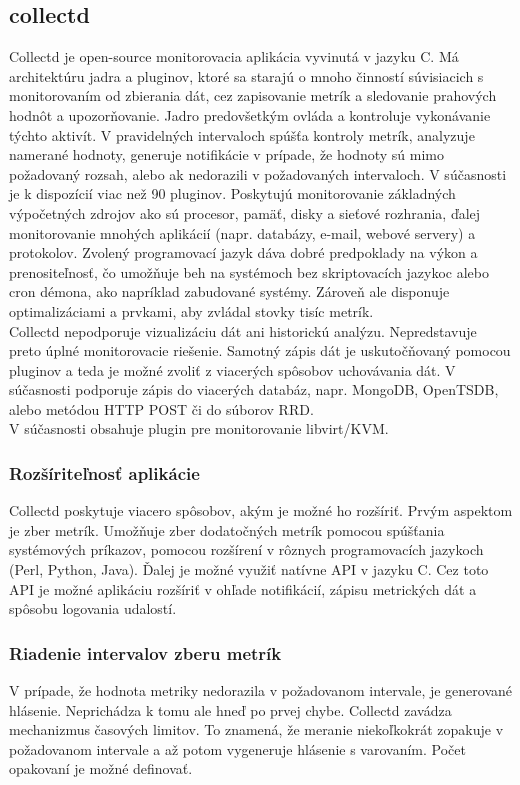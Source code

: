 \documentclass[11pt,final,oneside]{fithesis}
\begin{document}
\subsection{collectd}
Collectd je open-source monitorovacia aplikácia vyvinutá v jazyku C. Má architektúru jadra a pluginov, ktoré sa starajú o mnoho činností súvisiacich s monitorovaním od zbierania dát, cez
zapisovanie metrík a sledovanie prahových hodnôt a upozorňovanie. Jadro predovšetkým ovláda a kontroluje vykonávanie týchto aktivít. V pravidelných intervaloch spúšťa kontroly metrík, 
analyzuje namerané hodnoty, generuje notifikácie v prípade, že hodnoty sú mimo požadovaný rozsah, alebo ak nedorazili 
v požadovaných intervaloch. V súčasnosti je k dispozícií viac než 90 pluginov. Poskytujú monitorovanie základných výpočetných zdrojov ako sú procesor, pamäť, disky a sieťové rozhrania, ďalej monitorovanie
mnohých aplikácií (napr. databázy, e-mail, webové servery) a protokolov. Zvolený programovací jazyk dáva dobré predpoklady na výkon a prenositeľnosť, čo umožňuje beh na systémoch bez 
skriptovacích jazykoc alebo cron démona, ako napríklad zabudované systémy. Zároveň ale disponuje optimalizáciami a prvkami, aby zvládal stovky tisíc metrík. \cite{22} 
\\Collectd nepodporuje vizualizáciu dát ani historickú analýzu. Nepredstavuje preto úplné monitorovacie riešenie. Samotný zápis dát je uskutočňovaný pomocou pluginov a 
teda je možné zvoliť z viacerých spôsobov uchovávania dát. V súčasnosti podporuje zápis do viacerých databáz, napr. MongoDB, OpenTSDB, alebo metódou HTTP POST či do súborov RRD. 
\\V súčasnosti obsahuje plugin pre monitorovanie libvirt/KVM.

\subsubsection{Rozšíriteľnosť aplikácie}
Collectd poskytuje viacero spôsobov, akým je možné ho rozšíriť. Prvým aspektom je zber metrík. Umožňuje zber dodatočných metrík pomocou
spúšťania systémových príkazov, pomocou rozšírení v rôznych programovacích jazykoch (Perl, Python, Java). Ďalej je možné využiť natívne
API v jazyku C. Cez toto API je možné aplikáciu rozšíriť v ohľade notifikácií, zápisu metrických dát a spôsobu logovania udalostí.

\subsubsection{Riadenie intervalov zberu metrík}
V prípade, že hodnota metriky nedorazila v požadovanom intervale, je generované hlásenie. Neprichádza k tomu ale hneď po prvej chybe. Collectd zavádza mechanizmus časových limitov.
To znamená, že meranie niekoľkokrát zopakuje v požadovanom intervale a až potom vygeneruje hlásenie s varovaním. Počet opakovaní
je možné definovať. 
\end{document}
